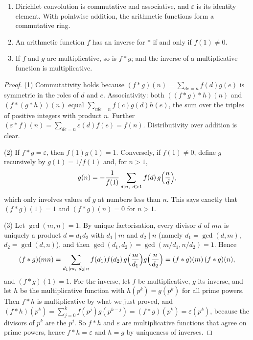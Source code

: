 \begin{proposition}\label{number-theory:proposition-dirichlet-ring}
\begin{enumerate}
\item Dirichlet convolution is commutative and associative, and $\varepsilon$ is its identity element. With pointwise addition, the arithmetic functions form a commutative ring.
\item An arithmetic function $f$ has an inverse for $*$ if and only if $f(1) \neq 0$.
\item If $f$ and $g$ are multiplicative, so is $f * g$; and the inverse of a multiplicative function is multiplicative.
\end{enumerate}
\end{proposition}

\begin{proof}
(1) Commutativity holds because $(f * g)(n) = \sum_{de = n}f(d)g(e)$ is symmetric in the roles of $d$ and $e$. Associativity: both $((f * g) * h)(n)$ and $(f * (g * h))(n)$ equal
$\sum_{cde = n}f(c)g(d)h(e)$, the sum over the triples of positive integers with product $n$. Further $(\varepsilon * f)(n) = \sum_{de = n}\varepsilon(d)f(e) = f(n)$. Distributivity over addition is clear.

(2) If $f * g = \varepsilon$, then $f(1)g(1) = 1$. Conversely, if $f(1) \neq 0$, define $g$ recursively by $g(1) = 1/f(1)$ and, for $n > 1$,
\[
g(n) = -\frac{1}{f(1)}\sum_{d \mid n, \ d > 1}f(d)\,g\Bigl(\frac{n}{d}\Bigr),
\]
which only involves values of $g$ at numbers less than $n$. This says exactly that $(f * g)(1) = 1$ and $(f * g)(n) = 0$ for $n > 1$.

(3) Let $\gcd(m, n) = 1$. By unique factorisation, every divisor $d$ of $mn$ is uniquely a product $d = d_1d_2$ with $d_1 \mid m$ and $d_2 \mid n$ (namely $d_1 = \gcd(d, m)$, $d_2 = \gcd(d, n)$), and then
$\gcd(d_1, d_2) = \gcd(m/d_1, n/d_2) = 1$. Hence
\[
(f * g)(mn) = \sum_{d_1 \mid m, \ d_2 \mid n}f(d_1)f(d_2)\,g\Bigl(\frac{m}{d_1}\Bigr)g\Bigl(\frac{n}{d_2}\Bigr) = (f * g)(m)\,(f * g)(n),
\]
and $(f * g)(1) = 1$. For the inverse, let $f$ be multiplicative, $g$ its inverse, and let $h$ be the multiplicative function with $h(p^k) = g(p^k)$ for all prime powers. Then $f * h$ is multiplicative by
what we just proved, and $(f * h)(p^k) = \sum_{j=0}^{k}f(p^j)g(p^{k-j}) = (f * g)(p^k) = \varepsilon(p^k)$, because the divisors of $p^k$ are the $p^j$. So $f * h$ and $\varepsilon$ are multiplicative
functions that agree on prime powers, hence $f * h = \varepsilon$ and $h = g$ by uniqueness of inverses.
\end{proof}

